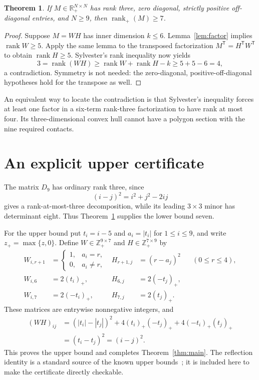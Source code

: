 \documentclass[11pt]{article}
\newtheorem{theorem}{Theorem}
\newcommand{\rank}{\operatorname{rank}}
\newcommand{\R}{\mathbb R}
\begin{document}
\begin{theorem}\label{thm:general}
If $M\in\R_+^{N\times N}$ has rank three, zero diagonal, strictly positive off-diagonal entries, and $N\geq9$, then $\rank_+(M)\geq7$.
\end{theorem}
\begin{proof}
Suppose $M=WH$ has inner dimension $k\leq6$. Lemma~\ref{lem:factor} implies $\rank W\geq5$. Apply the same lemma to the transposed factorization $M^{\mathsf T}=H^{\mathsf T}W^{\mathsf T}$ to obtain $\rank H\geq5$. Sylvester's rank inequality now yields
\[
 3=\rank(WH)\geq\rank W+\rank H-k\geq5+5-6=4,
\]
a contradiction. Symmetry is not needed: the zero-diagonal, positive-off-diagonal hypotheses hold for the transpose as well.
\end{proof}
An equivalent way to locate the contradiction is that Sylvester's inequality forces at least one factor in a six-term rank-three factorization to have rank at most four. Its three-dimensional convex hull cannot have a polygon section with the nine required contacts.

\section{An explicit upper certificate}
The matrix $D_9$ has ordinary rank three, since
\[
 (i-j)^2=i^2+j^2-2ij
\]
gives a rank-at-most-three decomposition, while its leading $3\times3$ minor has determinant eight. Thus Theorem~\ref{thm:general} supplies the lower bound seven.

For the upper bound put $t_i=i-5$ and $a_i=|t_i|$ for $1\leq i\leq9$, and write $z_+=\max\{z,0\}$. Define $W\in\mathbb Z_+^{9\times7}$ and $H\in\mathbb Z_+^{7\times9}$ by
\begin{align*}
 W_{i,r+1}&=\begin{cases}1,&a_i=r,\\0,&a_i\ne r,\end{cases}
 &H_{r+1,j}&=(r-a_j)^2 &&(0\leq r\leq4),\\
 W_{i,6}&=2(t_i)_+,&H_{6,j}&=2(-t_j)_+,\\
 W_{i,7}&=2(-t_i)_+,&H_{7,j}&=2(t_j)_+.
\end{align*}
These matrices are entrywise nonnegative integers, and
\begin{align*}
 (WH)_{ij}
 &=(|t_i|-|t_j|)^2
   +4(t_i)_+(-t_j)_++4(-t_i)_+(t_j)_+\\
 &=(t_i-t_j)^2=(i-j)^2.
\end{align*}
This proves the upper bound and completes Theorem~\ref{thm:main}. The reflection identity is a standard source of the known upper bounds~\cite{gg}; it is included here to make the certificate directly checkable.
\end{document}
